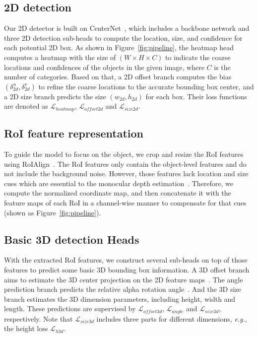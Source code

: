 \documentclass[10pt,twocolumn,letterpaper]{article}
\begin{document}
\subsection{2D detection}
Our 2D detector is built on CenterNet~\cite{zhou2019objects}, which includes a backbone network and three 2D detection sub-heads to compute the location, size, and confidence for each potential 2D box.
As shown in Figure~\ref{fig:pipeline}, the heatmap head computes a heatmap with the size of $(W\times H\times C)$ to indicate the coarse locations and confidences of the objects in the given image, where $C$ is the number of categories.
Based on that, a 2D offset branch computes the bias $(\delta_{2d}^u,\delta_{2d}^v)$ to refine the coarse locations to the accurate bounding box center, and a 2D size branch predicts the size $(w_{2d},h_{2d})$ for each box. 
Their loss functions are denoted as $\mathcal{L}_{heatmap}$, $\mathcal{L}_{offset2d}$ and $\mathcal{L}_{size2d}$. 





\subsection{RoI feature representation}
To guide the model to focus on the object, we crop and resize the RoI features using RoIAlign~\cite{he2017mask}.
The RoI features only contain the object-level features and do not include the background noise. 
However, those features lack location and size cues which are essential to the monocular depth estimation~\cite{dijk2019neural}. 
Therefore, we compute the normalized coordinate map, and then concatenate it with the feature maps of each RoI in a channel-wise manner to compensate for that cues (shown as Figure~\ref{fig:pipeline}).




\subsection{Basic 3D detection Heads}
With the extracted RoI features, we construct several sub-heads on top of those features to predict some basic 3D bounding box information. A 3D offset branch aims to estimate the 3D center projection on the 2D feature maps~\cite{chen2020monopair}. The angle prediction branch predicts the relative alpha rotation angle~\cite{mousavian20173d}. And the 3D size branch estimates the 3D dimension parameters, including height, width and length. These predictions are supervised by $\mathcal{L}_{offset3d}$, $\mathcal{L}_{angle}$ and $\mathcal{L}_{size3d}$, respectively. Note that $\mathcal{L}_{size3d}$ includes three parts for different dimensions, \textit{e.g.}, the height loss $\mathcal{L}_{h3d}$. 
\end{document}

